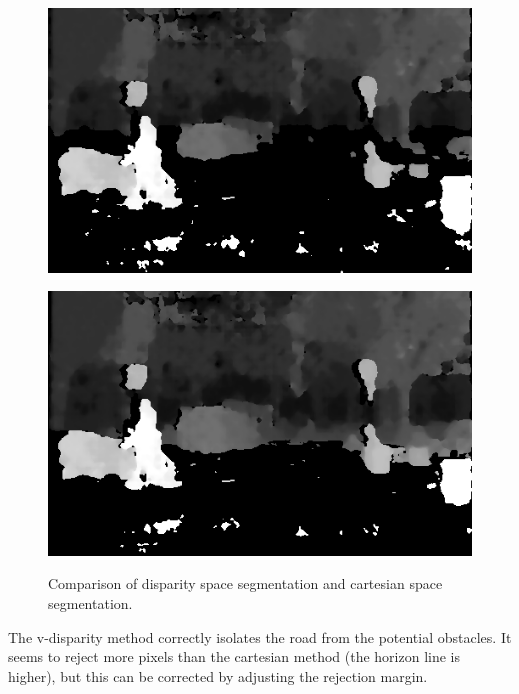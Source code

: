 \documentclass[a4paper,11pt]{article}
\begin{document}
\begin{figure}[H]
\centering
\begin{minipage}{0.45\linewidth}
\centering
\includegraphics[scale=0.3]{pic/v-disparity-segmentation.png}
\label{v-disparity-comparison:a}
\end{minipage}
\begin{minipage}{0.45\linewidth}
\centering
\includegraphics[scale=0.3]{pic/cartesian-02m.png}
\label{v-disparity-comparison:b}
\end{minipage}
\caption{Comparison of disparity space segmentation and cartesian space segmentation.}
\label{v-disparity-comparison}
\end{figure}

The v-disparity method correctly isolates the road from the potential obstacles. It seems to reject more pixels than the cartesian method (the horizon line is higher), but this can be corrected by adjusting the rejection margin.  
\end{document}
